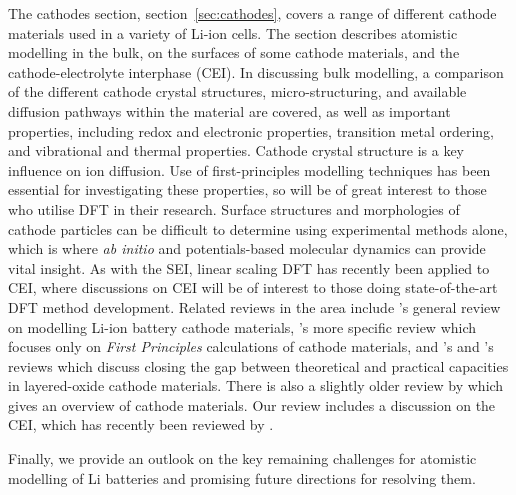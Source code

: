 \documentclass[../main.tex]{subfiles}
\begin{document}
The cathodes section, section~\ref{sec:cathodes}, covers a range of different cathode materials used in a variety of Li-ion cells. The section describes atomistic modelling in the bulk, on the surfaces of some cathode materials, and the cathode-electrolyte interphase (CEI). In discussing bulk modelling, a comparison of the different cathode crystal structures, micro-structuring, and available diffusion pathways within the material are covered, as well as important properties, including redox and electronic properties, transition metal ordering, and vibrational and thermal properties. Cathode crystal structure is a key influence on ion diffusion. Use of first-principles modelling techniques has been essential for investigating these properties, so will be of great interest to those who utilise DFT in their research. Surface structures and morphologies of cathode particles can be difficult to determine using experimental methods alone, which is where \textit{ab initio} and potentials-based molecular dynamics can provide vital insight. As with the SEI, linear scaling DFT has recently been applied to CEI, where discussions on CEI will be of interest to those doing state-of-the-art DFT method development. Related reviews in the area include \citeauthor{ma2018computer}'s \cite{ma2018computer} general review on modelling Li-ion battery cathode materials, \citeauthor{yan2014review}'s \cite{yan2014review} more specific review which focuses only on \textit{First Principles} calculations of cathode materials, and \citeauthor{radin2017narrowing}'s \cite{radin2017narrowing} and \citeauthor{wang2018reviving}'s \cite{wang2018reviving} reviews which discuss closing the gap between theoretical and practical capacities in layered-oxide cathode materials. There is also a slightly older review by \citeauthor{daniel2014cathode} \cite{daniel2014cathode} which gives an overview of cathode materials. Our review includes a discussion on the CEI, which has recently been reviewed by \citeauthor{maleki2019controllable} \cite{maleki2019controllable}.

Finally, we provide an outlook on the key remaining challenges for atomistic modelling of Li batteries and promising future directions for resolving them.
\end{document}
